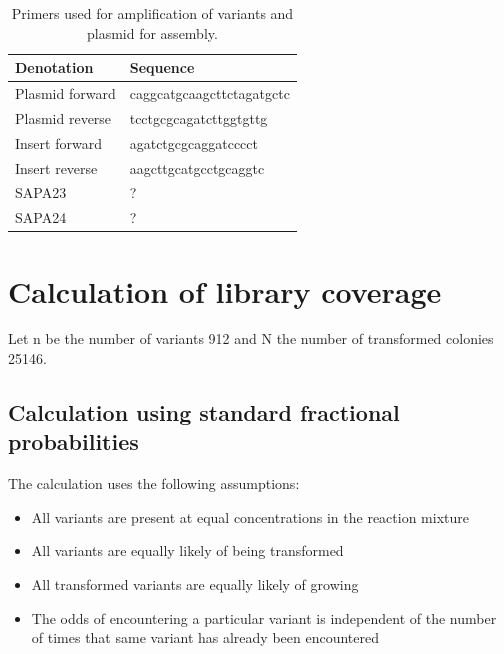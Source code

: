 \documentclass{article}
\begin{document}
	\begin{table}[h!]
		\begin{center}
			\caption{Primers used for amplification of variants and plasmid for assembly.}
			
			\begin{tabular}{l|l} %
				\toprule %
				\textbf{Denotation} & \textbf{Sequence} \\
				\midrule %
				Plasmid forward & caggcatgcaagcttctagatgctc \\
				Plasmid reverse & tcctgcgcagatcttggtgttg \\
				Insert forward & agatctgcgcaggatcccct \\
				Insert reverse & aagcttgcatgcctgcaggtc \\
				SAPA23 & ? \\
				SAPA24 & ? \\
				\bottomrule %
				
			\end{tabular}
		\end{center}
	\end{table}

	\newpage
	\section{Calculation of library coverage}
	\label{calc}
	Let n be the number of variants 912 and N the number of transformed colonies 25146.
	\subsection{Calculation using standard fractional probabilities}
	The calculation uses the following assumptions:
	\begin{itemize}
		\item All variants are present at equal concentrations in the reaction mixture
		\item All variants are equally likely of being transformed
		\item All transformed variants are equally likely of growing
		\item The odds of encountering a particular variant is independent of the number of times that same variant has already been encountered
	\end{itemize}
	
\end{document}

